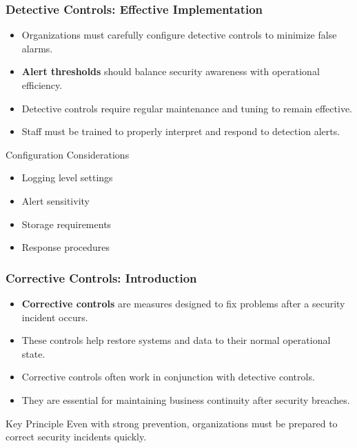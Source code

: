 \documentclass{beamer}
\begin{document}
\begin{frame}
    \frametitle{Detective Controls: Effective Implementation}
    
    \begin{itemize}
        \item Organizations must carefully configure detective controls to minimize false alarms.
        
        \item \textbf{Alert thresholds} should balance security awareness with operational efficiency.
        
        \item Detective controls require regular maintenance and tuning to remain effective.
        
        \item Staff must be trained to properly interpret and respond to detection alerts.
    \end{itemize}
    
    \begin{exampleblock}{Configuration Considerations}
        \begin{itemize}
            \item Logging level settings
            \item Alert sensitivity
            \item Storage requirements
            \item Response procedures
        \end{itemize}
    \end{exampleblock}
\end{frame}

\begin{frame}
    \frametitle{Corrective Controls: Introduction}
    
    \begin{itemize}
        \item \textbf{Corrective controls} are measures designed to fix problems after a security incident occurs.
        
        \item These controls help restore systems and data to their normal operational state.
        
        \item Corrective controls often work in conjunction with detective controls.
        
        \item They are essential for maintaining business continuity after security breaches.
    \end{itemize}
    
    \begin{alertblock}{Key Principle}
        Even with strong prevention, organizations must be prepared to correct security incidents quickly.
    \end{alertblock}
\end{frame}
\end{document}
